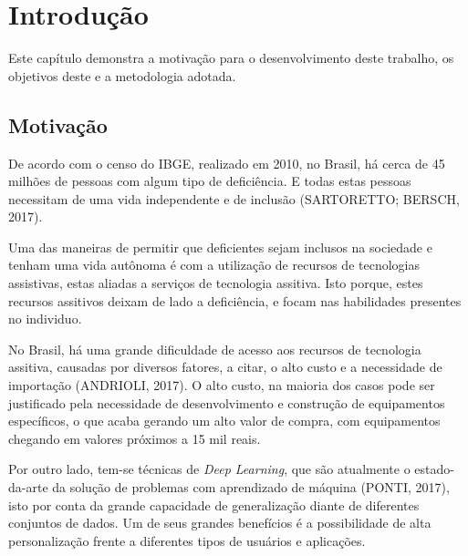 \chapter[Introdução]{Introdução}


Este capítulo demonstra a motivação para o desenvolvimento deste trabalho, os objetivos deste e a metodologia adotada.

\section{Motivação} %

\par De acordo com o censo do IBGE, realizado em 2010, no Brasil, há cerca de 45 milhões de pessoas com algum tipo de deficiência. E todas estas pessoas necessitam de uma vida independente e de inclusão (SARTORETTO; BERSCH, 2017).

\par Uma das maneiras de permitir que deficientes sejam inclusos na sociedade e tenham uma vida autônoma é com a utilização de  recursos de tecnologias assistivas, estas aliadas a serviços de tecnologia assitiva. Isto porque, estes recursos assitivos deixam de lado a deficiência, e focam nas habilidades presentes no individuo.

\par No Brasil, há uma grande dificuldade de acesso aos recursos de tecnologia assitiva, causadas por diversos fatores, a citar, o alto custo e a necessidade de importação (ANDRIOLI, 2017). O alto custo, na maioria dos casos pode ser justificado pela necessidade de desenvolvimento e construção de equipamentos específicos, o que acaba gerando um alto valor de compra, com equipamentos chegando em valores próximos a 15 mil reais.

\par Por outro lado, tem-se técnicas de \textit{Deep Learning}, que são atualmente o estado-da-arte da solução de problemas com aprendizado de máquina (PONTI, 2017), isto por conta da grande capacidade de generalização diante de diferentes conjuntos de dados. Um de seus grandes benefícios é a possibilidade de alta personalização frente a diferentes tipos de usuários e aplicações.

